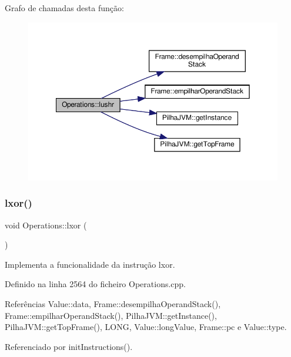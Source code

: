 Grafo de chamadas desta função\+:\nopagebreak
\begin{figure}[H]
\begin{center}
\leavevmode
\includegraphics[width=350pt]{classOperations_a3b7c61f8bca7b3ad0dacae6649aee042_cgraph}
\end{center}
\end{figure}
\mbox{\label{classOperations_ac135e723f1ac6a27c736e6b8e7d06a45}} 
\subsubsection{\texorpdfstring{lxor()}{lxor()}}
{\footnotesize\ttfamily void Operations\+::lxor (\begin{DoxyParamCaption}{ }\end{DoxyParamCaption})\hspace{0.3cm}{\ttfamily [private]}}



Implementa a funcionalidade da instrução lxor. 



Definido na linha 2564 do ficheiro Operations.\+cpp.



Referências Value\+::data, Frame\+::desempilha\+Operand\+Stack(), Frame\+::empilhar\+Operand\+Stack(), Pilha\+J\+V\+M\+::get\+Instance(), Pilha\+J\+V\+M\+::get\+Top\+Frame(), L\+O\+NG, Value\+::long\+Value, Frame\+::pc e Value\+::type.



Referenciado por init\+Instructions().

